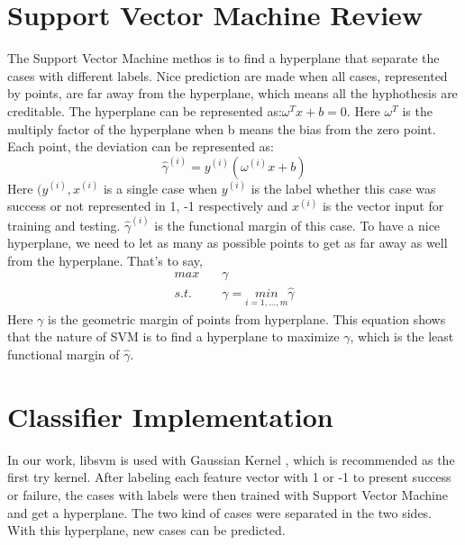 \section{Support Vector Machine Review}
The Support Vector Machine methos is to find a hyperplane that separate the cases with different labels. Nice prediction are made when all cases, represented by points, are far away from the hyperplane, which means all the hyphothesis are creditable. The hyperplane can be represented as:$\omega^{T}x+b=0$. Here $\omega^{T}$ is the multiply factor of the hyperplane when b means the bias from the zero point. Each point, the deviation can be represented as: \\
\begin{equation}
    \hat{\gamma}^{(i)}=y^{(i)}(\omega^{(i)}x+b)
\end{equation}
Here $(y^{(i)}, x^{(i)}$ is a single case when $y^{(i)}$ is the label whether this case was success or not represented in {1, -1} respectively and $x^{(i)}$ is the vector input for training and testing. $\hat{\gamma}^{(i)}$ is the functional margin of this case. To have a nice hyperplane, we need to let as many as possible points to get as far away as well from the hyperplane. That's to say,
\begin{equation}
    \begin{split}
        max\quad&\gamma \nonumber \\
        s.t.\quad&\gamma = \underset{i = 1,\ldots,m}{min}\hat{\gamma}
    \end{split}
\end{equation}
Here $\gamma$ is the geometric margin of points from hyperplane. This equation shows that the nature of SVM is to find a hyperplane to maximize $\gamma$, which is the least functional margin of $\hat{\gamma}$.
\section{Classifier Implementation}
\indent In our work, libsvm \cite{CC01a} is used with Gaussian Kernel \cite{keerthi2003asymptotic}, which is recommended as the first try kernel. After labeling each feature vector with 1 or -1 to present success or failure, the cases with labels were then trained with Support Vector Machine and get a hyperplane. The two kind of cases were separated in the two sides. With this hyperplane, new cases can be predicted. \\
